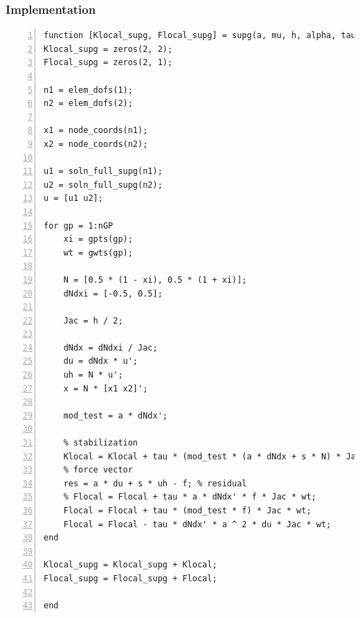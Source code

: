 \documentclass[12pt, oneside]{article}
\begin{document}
\subsubsection{Implementation}
\begin{lstlisting}[frame=single, numbers=left, style=Matlab-editor]
function [Klocal_supg, Flocal_supg] = supg(a, mu, h, alpha, tau, s, nGP, gpts, gwts, elem_dofs, node_coords, soln_full_supg, Klocal, Flocal)
Klocal_supg = zeros(2, 2);
Flocal_supg = zeros(2, 1);

n1 = elem_dofs(1);
n2 = elem_dofs(2);

x1 = node_coords(n1);
x2 = node_coords(n2);

u1 = soln_full_supg(n1);
u2 = soln_full_supg(n2);
u = [u1 u2];

for gp = 1:nGP
	xi = gpts(gp);
	wt = gwts(gp);
	
	N = [0.5 * (1 - xi), 0.5 * (1 + xi)];
	dNdxi = [-0.5, 0.5];
	
	Jac = h / 2;
	
	dNdx = dNdxi / Jac;
	du = dNdx * u';
	uh = N * u';
	x = N * [x1 x2]';
	
	mod_test = a * dNdx';
	
	% stabilization
	Klocal = Klocal + tau * (mod_test * (a * dNdx + s * N) * Jac * wt);
	% force vector
	res = a * du + s * uh - f; % residual
	% Flocal = Flocal + tau * a * dNdx' * f * Jac * wt;
	Flocal = Flocal + tau * (mod_test * f) * Jac * wt;
	Flocal = Flocal - tau * dNdx' * a ^ 2 * du * Jac * wt;
end

Klocal_supg = Klocal_supg + Klocal;
Flocal_supg = Flocal_supg + Flocal;

end
   \end{lstlisting}
\end{document}
